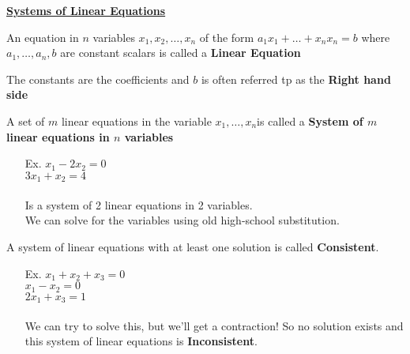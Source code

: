 \documentclass{letter}
\newcommand{\0}[1]{\begin{bmatrix}#1\end{bmatrix}}
\newcommand{\h}[1]{\underline{\textbf{#1}}}
\begin{document}
	\h{Systems of Linear Equations}
	
	An equation in $n$ variables $x_1, x_2, \dots, x_n$ of the form $a_1x_1 + \dots + x_nx_n = b$ where $a_1, \dots, a_n, b$ are constant scalars is called a \textbf{Linear Equation}
	
	The constants are the coefficients and $b$ is often referred tp as the \textbf{Right hand side}
	
	A set of $m$ linear equations in the variable $x_1, \dots, x_n$is called a \textbf{System of $m$ linear equations in $n$ variables}
	
	\begin{itemize}
		\item[Ex. ] $x_1 - 2x_2 = 0$\\$3x_1 + x_2 = 4$\\\\
		Is a system of 2 linear equations in 2 variables.\\
		We can solve for the variables using old high-school substitution.
	\end{itemize}
	
	A system of linear equations with at least one solution is called \textbf{Consistent}.
	
	\begin{itemize}
		\item[Ex. ] $x_1 + x_2  + x_3 = 0$\\
		$x_1 - x_2 = 0$\\
		$2x_1 + x_3 = 1$\\\\
		We can try to solve this, but we'll get a contraction! So no solution exists and this system of linear equations is \textbf{Inconsistent}.
	\end{itemize}
\end{document}
